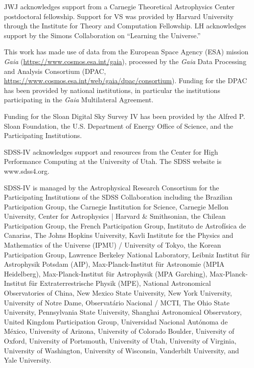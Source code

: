   JWJ acknowledges support from a Carnegie Theoretical Astrophysics Center postdoctoral fellowship. Support for VS was provided by Harvard University through the Institute for Theory and Computation Fellowship. LH acknowledges support by the Simons Collaboration on ``Learning the Universe.''

  This work has made use of data from the European Space Agency (ESA) mission {\it Gaia} (\url{https://www.cosmos.esa.int/gaia}), processed by the {\it Gaia} Data Processing and Analysis Consortium (DPAC, \url{https://www.cosmos.esa.int/web/gaia/dpac/consortium}). Funding for the DPAC has been provided by national institutions, in particular the institutions participating in the {\it Gaia} Multilateral Agreement.
  
  Funding for the Sloan Digital Sky 
  Survey IV has been provided by the 
  Alfred P. Sloan Foundation, the U.S. 
  Department of Energy Office of 
  Science, and the Participating 
  Institutions. 
  
  SDSS-IV acknowledges support and 
  resources from the Center for High 
  Performance Computing  at the 
  University of Utah. The SDSS 
  website is www.sdss4.org.
  
  SDSS-IV is managed by the 
  Astrophysical Research Consortium 
  for the Participating Institutions 
  of the SDSS Collaboration including 
  the Brazilian Participation Group, 
  the Carnegie Institution for Science, 
  Carnegie Mellon University, Center for 
  Astrophysics | Harvard \& 
  Smithsonian, the Chilean Participation 
  Group, the French Participation Group, 
  Instituto de Astrof\'isica de 
  Canarias, The Johns Hopkins 
  University, Kavli Institute for the 
  Physics and Mathematics of the 
  Universe (IPMU) / University of 
  Tokyo, the Korean Participation Group, 
  Lawrence Berkeley National Laboratory, 
  Leibniz Institut f\"ur Astrophysik 
  Potsdam (AIP),  Max-Planck-Institut 
  f\"ur Astronomie (MPIA Heidelberg), 
  Max-Planck-Institut f\"ur 
  Astrophysik (MPA Garching), 
  Max-Planck-Institut f\"ur 
  Extraterrestrische Physik (MPE), 
  National Astronomical Observatories of 
  China, New Mexico State University, 
  New York University, University of 
  Notre Dame, Observat\'ario 
  Nacional / MCTI, The Ohio State 
  University, Pennsylvania State 
  University, Shanghai 
  Astronomical Observatory, United 
  Kingdom Participation Group, 
  Universidad Nacional Aut\'onoma 
  de M\'exico, University of Arizona, 
  University of Colorado Boulder, 
  University of Oxford, University of 
  Portsmouth, University of Utah, 
  University of Virginia, University 
  of Washington, University of 
  Wisconsin, Vanderbilt University, 
  and Yale University.

